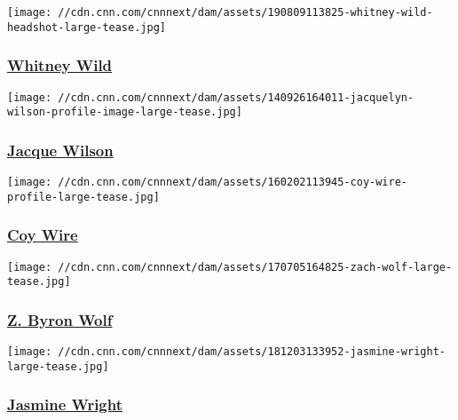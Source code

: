 \href{/profiles/whitney-wild-bio}{}

\texttt{[image: //cdn.cnn.com/cnnnext/dam/assets/190809113825-whitney-wild-headshot-large-tease.jpg]}

\hypertarget{whitney-wild}{%
\subsubsection{\texorpdfstring{\href{/profiles/whitney-wild-bio}{Whitney
Wild}}{Whitney Wild}}\label{whitney-wild}}

\href{/profiles/jacque-wilson}{}

\texttt{[image: //cdn.cnn.com/cnnnext/dam/assets/140926164011-jacquelyn-wilson-profile-image-large-tease.jpg]}

\hypertarget{jacque-wilson}{%
\subsubsection{\texorpdfstring{\href{/profiles/jacque-wilson}{Jacque
Wilson}}{Jacque Wilson}}\label{jacque-wilson}}

\href{/profiles/coy-wire-profile}{}

\texttt{[image: //cdn.cnn.com/cnnnext/dam/assets/160202113945-coy-wire-profile-large-tease.jpg]}

\hypertarget{coy-wire}{%
\subsubsection{\texorpdfstring{\href{/profiles/coy-wire-profile}{Coy
Wire}}{Coy Wire}}\label{coy-wire}}

\href{/profiles/z-byron-wolf}{}

\texttt{[image: //cdn.cnn.com/cnnnext/dam/assets/170705164825-zach-wolf-large-tease.jpg]}

\hypertarget{z-byron-wolf}{%
\subsubsection{\texorpdfstring{\href{/profiles/z-byron-wolf}{Z. Byron
Wolf}}{Z. Byron Wolf}}\label{z-byron-wolf}}

\href{/profiles/jasmine-wright}{}

\texttt{[image: //cdn.cnn.com/cnnnext/dam/assets/181203133952-jasmine-wright-large-tease.jpg]}

\hypertarget{jasmine-wright}{%
\subsubsection{\texorpdfstring{\href{/profiles/jasmine-wright}{Jasmine
Wright}}{Jasmine Wright}}\label{jasmine-wright}}

